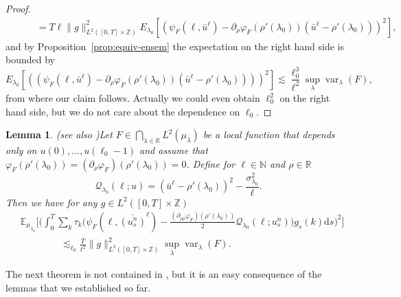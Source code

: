 \documentclass[11pt, a4paper]{article}
\newcommand{\mathd}{\mathrm{d}}
\newcommand{\tmop}[1]{\ensuremath{\operatorname{#1}}}
\newtheorem{lemma}[theorem]{Lemma}
\newcommand{\CQ}{\mathscr{Q}}
\newcommand{\1}{\mathbf{1}}
\begin{document}
\begin{proof}
\begin{align*}
   &\qquad = T \ell \| g \|_{L^2 ([0, T] \times \mathbb{Z})}^2 E_{\lambda_0}
   [(\psi_F (\ell, \bar{u}^{\ell}) - \partial_{\rho} \varphi_F (\rho'
   (\lambda_0)) (\bar{u}^{\ell} - \rho' (\lambda_0)))^2],
  \end{align*}
  and by Proposition~\ref{prop:equiv-ensem} the expectation on the right
  hand side is bounded by
  \[ E_{\lambda_0} [((\psi_F (\ell, \bar{u}^{\ell}) - \partial_{\rho}
     \varphi_F (\rho' (\lambda_0)) (\bar{u}^{\ell} - \rho' (\lambda_0))))^2]
     \lesssim \frac{\ell_0^3}{\ell^2} \sup_{\lambda} \tmop{var}_{\lambda} (F),
  \]
  from where our claim follows. Actually we could even obtain $\ell_0^2$ on
  the right hand side, but we do not care about the dependence on $\ell_0$.
\end{proof}

\begin{lemma}(see also \cite[Lemma~4]{bib:goncalvesJara})\label{lem:quadratic-corrector}
  Let $F \in \bigcap_{\lambda \in \mathbb{R}} L^2 ({\mu}_{\lambda})$ be a
  local function that depends only on $u (0), \ldots, u (\ell_0 - 1)$ and
  assume that $\varphi_F (\rho' (\lambda_0)) = (\partial_{\rho} \varphi_F)
  (\rho' (\lambda_0)) = 0$. Define for $\ell \in \mathbb{N}$ and $\rho \in
  \mathbb{R}$
  \[ \CQ_{\lambda_0} (\ell ; u) = (\bar{u}^{\ell} - \rho' (\lambda_0))^2 -
     \frac{\sigma^2_{\lambda_0}}{\ell} . \]
  Then we have for any $g \in L^2 ([0, T] \times \mathbb{Z})$
  \begin{align*}
  & \mathbb{E}_{{\mu}_{\lambda_0}} \Big[ \Big( \int_0^T \sum_k \tau_k
     \big( \psi_F ( \ell, \overline{(u^{n_{}}_s)}^{\ell} ) -
     \frac{(\partial_{\rho \rho} \varphi_F) (\rho' (\lambda_0))}{2}
     \CQ_{\lambda_0} (\ell ; u^n_s) \big) g_s (k) \mathd s \Big)^2 \Big]
  \\
  & \hspace{50pt} \lesssim_{\ell_0} \frac{T}{\ell^2} \| g \|_{L^2 ([0, T] \times
     \mathbb{Z})}^2 \sup_{\lambda} \tmop{var}_{\lambda} (F) .
  \end{align*}
\end{lemma}

The next theorem is not contained in \cite{bib:goncalvesJara},
but it is an easy consequence of the lemmas that we established so far.
\end{document}
